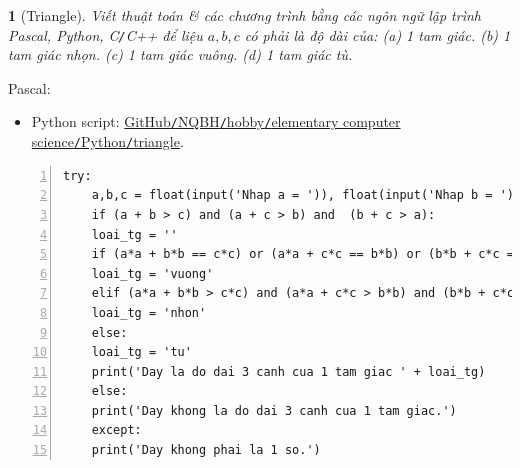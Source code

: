 \documentclass{article}
\newtheorem{baitoan}{}
\begin{document}
\begin{baitoan}[Triangle]
	Viết thuật toán \& các chương trình bằng các ngôn ngữ lập trình {\sf Pascal, Python, C{\tt/}C++} để liệu $a,b,c$ có phải là độ dài của: (a) 1 tam giác. (b) 1 tam giác nhọn. (c) 1 tam giác vuông. (d) 1 tam giác tù.
\end{baitoan}
\noindent Pascal: 

\begin{itemize}
	\item Python script: \href{https://github.com/NQBH/hobby/blob/master/elementary_computer_science/Python/triangle.py}{GitHub{\tt/}NQBH{\tt/}hobby{\tt/}elementary computer science{\tt/}Python{\tt/}triangle}.
\end{itemize}

\begin{Verbatim}[numbers=left,xleftmargin=5mm]
	try:
	a,b,c = float(input('Nhap a = ')), float(input('Nhap b = ')), float(input('Nhap c = '))
	if (a + b > c) and (a + c > b) and  (b + c > a):
	loai_tg = ''
	if (a*a + b*b == c*c) or (a*a + c*c == b*b) or (b*b + c*c == a*a):
	loai_tg = 'vuong'
	elif (a*a + b*b > c*c) and (a*a + c*c > b*b) and (b*b + c*c > a*a):
	loai_tg = 'nhon'
	else:
	loai_tg = 'tu'
	print('Day la do dai 3 canh cua 1 tam giac ' + loai_tg)
	else: 
	print('Day khong la do dai 3 canh cua 1 tam giac.')			
	except:
	print('Day khong phai la 1 so.')
\end{Verbatim}
\end{document}

